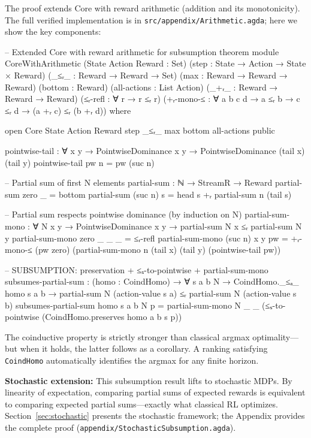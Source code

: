 \documentclass[9pt,a4paper]{article}
\newcommand{\fpath}[1]{\nolinkurl{#1}}
\theoremstyle{plain}
\theoremstyle{definition}
\theoremstyle{remark}
\begin{document}
The proof extends Core with reward arithmetic (addition and its monotonicity). The full verified implementation is in \fpath{src/appendix/Arithmetic.agda}; here we show the key components:

\begin{code}[hide]
-- Extended Core with reward arithmetic for subsumption theorem
module CoreWithArithmetic
  (State Action Reward : Set)
  (step                : State → Action → State × Reward)
  (_≤ᵣ_                : Reward → Reward → Set)
  (max                 : Reward → Reward → Reward)
  (bottom              : Reward)
  (all-actions         : List Action)
  (_+ᵣ_                : Reward → Reward → Reward)
  (≤ᵣ-refl             : ∀ {r} → r ≤ᵣ r)
  (+ᵣ-mono-≤           : ∀ {a b c d} → a ≤ᵣ b → c ≤ᵣ d → (a +ᵣ c) ≤ᵣ (b +ᵣ d))
  where

  open Core State Action Reward step _≤ᵣ_ max bottom all-actions public

  pointwise-tail : ∀ {x y} → PointwiseDominance x y → PointwiseDominance (tail x) (tail y)
  pointwise-tail pw n = pw (suc n)
\end{code}

\begin{code}
  -- Partial sum of first N elements
  partial-sum : ℕ → StreamR → Reward
  partial-sum zero    _ = bottom
  partial-sum (suc n) s = head s +ᵣ partial-sum n (tail s)

  -- Partial sum respects pointwise dominance (by induction on N)
  partial-sum-mono : ∀ N x y → PointwiseDominance x y → 
                     partial-sum N x ≤ᵣ partial-sum N y
  partial-sum-mono zero _ _ _ = ≤ᵣ-refl
  partial-sum-mono (suc n) x y pw = 
    +ᵣ-mono-≤ (pw zero) (partial-sum-mono n (tail x) (tail y) (pointwise-tail pw))

  -- SUBSUMPTION: preservation + ≤ₛ-to-pointwise + partial-sum-mono
  subsumes-partial-sum : (homo : CoindHomo) → ∀ s a b N →
    CoindHomo._≤ₐ_ homo s a b →
    partial-sum N (action-value s a) ≤ᵣ partial-sum N (action-value s b)
  subsumes-partial-sum homo s a b N p = 
    partial-sum-mono N _ _ (≤ₛ-to-pointwise (CoindHomo.preserves homo a b s p))
\end{code}

\noindent The coinductive property is strictly stronger than classical argmax optimality---but when it holds, the latter follows as a corollary.  A ranking satisfying \texttt{CoindHomo} automatically identifies the argmax for any finite horizon.

\textbf{Stochastic extension:} This subsumption result lifts to stochastic MDPs. By linearity of expectation, comparing partial sums of expected rewards is equivalent to comparing expected partial sums---exactly what classical RL optimizes. Section~\ref{sec:stochastic} presents the stochastic framework; the Appendix provides the complete proof (\fpath{appendix/StochasticSubsumption.agda}).
\end{document}
